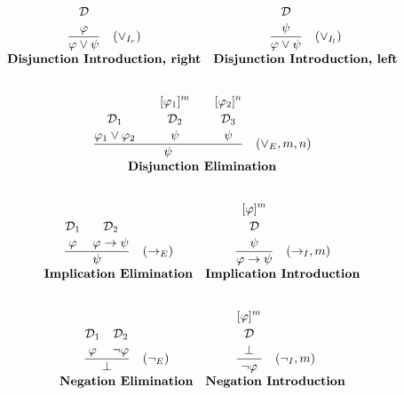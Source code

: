 \[
\begin{array}{c c}
\frac{\displaystyle \overset{\displaystyle\mathcal{D} \strut} {\varphi 
\strut}}{\displaystyle \varphi \vee \psi \strut} \quad (\vee_{I_r}) 
& \frac{\displaystyle \overset{\displaystyle\mathcal{D} \strut} {\psi \strut}}{\displaystyle \varphi \vee \psi \strut} \quad (\vee_{I_l}) \\[5pt]
\textbf{Disjunction Introduction, right} & \textbf{Disjunction Introduction, left} \\[10pt]

\end{array}
\]

\[
\begin{array}{c c}
\multicolumn{2}{c}{
\frac{\overset{\displaystyle\mathcal{D}_1 \strut} {\displaystyle\varphi_1 \vee \varphi_2 \strut} \quad \quad \overset{\displaystyle[\varphi_1]^m\strut}{\overset{\displaystyle\mathcal{D}_2 \strut} {\displaystyle\psi 
\strut}} \quad \quad \overset{\displaystyle[\varphi_2]^n\strut}{\overset{\displaystyle\mathcal{D}_3 \strut} {\displaystyle\psi 
\strut}}}{\displaystyle\psi\strut} \quad (\vee_E, m, n)
} \\[5pt]
\multicolumn{2}{c}{\textbf{Disjunction Elimination}} \\[10pt]
\end{array}
\]

\[
\begin{array}{c c}
\frac{\overset{\displaystyle\mathcal{D}_1\strut}{\displaystyle \varphi \strut}\quad \overset{\displaystyle\mathcal{D}_2\strut} {\displaystyle \varphi \to \psi \strut}}{\displaystyle\psi\strut} \quad (\to_E) 
& \frac{\overset{\displaystyle[\varphi]^m\strut}{\overset{\displaystyle\mathcal{D} \strut} {\displaystyle\psi 
\strut}}}{\displaystyle \varphi \to \psi \strut} \quad (\to_I, m) \\[5pt]
\textbf{Implication Elimination} & \textbf{Implication Introduction}\\[10pt]
\end{array}
\]

\[
\begin{array}{c c}
\frac{\overset{\displaystyle\mathcal{D}_1\strut}{\displaystyle \varphi \strut}\quad \overset{\displaystyle\mathcal{D}_2\strut} {\displaystyle \neg \varphi \strut}}{\displaystyle\bot\strut} \quad (\neg_E) 
& \frac{\overset{\displaystyle[\varphi]^m\strut}{\overset{\displaystyle\mathcal{D} \strut} {\displaystyle\bot 
\strut}}}{\displaystyle\neg \varphi\strut} \quad (\neg_I, m) \\[5pt]
\textbf{Negation Elimination} & \textbf{Negation Introduction}\\[10pt]
\end{array}
\]

